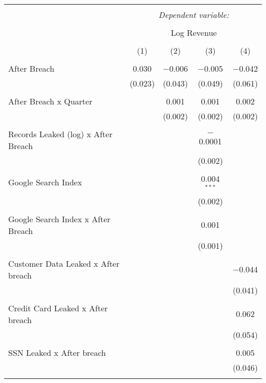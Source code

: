 
\begin{table}[!htbp] \centering 
  \caption{} 
  \label{} 
\begin{tabular}{@{\extracolsep{5pt}}lcccc} 
\\[-1.8ex]\hline 
\hline \\[-1.8ex] 
 & \multicolumn{4}{c}{\textit{Dependent variable:}} \\ 
\cline{2-5} 
\\[-1.8ex] & \multicolumn{4}{c}{Log Revenue} \\ 
\\[-1.8ex] & (1) & (2) & (3) & (4)\\ 
\hline \\[-1.8ex] 
 After Breach & 0.030 & $-$0.006 & $-$0.005 & $-$0.042 \\ 
  & (0.023) & (0.043) & (0.049) & (0.061) \\ 
  & & & & \\ 
 After Breach x Quarter &  & 0.001 & 0.001 & 0.002 \\ 
  &  & (0.002) & (0.002) & (0.002) \\ 
  & & & & \\ 
 Records Leaked (log) x After Breach &  &  & $-$0.0001 &  \\ 
  &  &  & (0.002) &  \\ 
  & & & & \\ 
 Google Search Index &  &  & 0.004$^{***}$ &  \\ 
  &  &  & (0.002) &  \\ 
  & & & & \\ 
 Google Search Index x After Breach &  &  & 0.001 &  \\ 
  &  &  & (0.001) &  \\ 
  & & & & \\ 
 Customer Data Leaked x After breach &  &  &  & $-$0.044 \\ 
  &  &  &  & (0.041) \\ 
  & & & & \\ 
 Credit Card Leaked x After breach &  &  &  & 0.062 \\ 
  &  &  &  & (0.054) \\ 
  & & & & \\ 
 SSN Leaked x After breach &  &  &  & 0.005 \\ 
  &  &  &  & (0.046) \\ 
  & & & & \\ 

\end{tabular}
\end{table}
